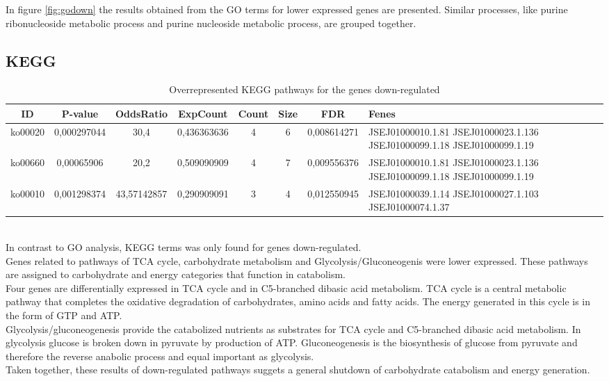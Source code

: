 \documentclass[12pt, a4paper]{report}
\begin{document}
In figure \ref{fig:godown} the results obtained from the GO terms for lower expressed genes are presented. Similar processes, like purine ribonucleoside metabolic process and purine nucleoside metabolic process, are grouped together. 


\subsection{KEGG}

\begin{table}[H]
	\centering
	\tiny
	\begin{tabular}{c|c|c|c|c|c|c|p{2cm}}
		\textbf{ID}&\textbf{P-value}&\textbf{OddsRatio}&\textbf{ExpCount}&\textbf{Count}&\textbf{Size}& \textbf{FDR}&\textbf{Fenes}\\
		\hline
ko00020&	0,000297044&	30,4&	0,436363636	&4	&6&	0,008614271	&JSEJ01000010.1.81 JSEJ01000023.1.136 JSEJ01000099.1.18 JSEJ01000099.1.19\\
\hline
ko00660&	0,00065906&	20,2&	0,509090909&	4&	7&	0,009556376	&JSEJ01000010.1.81 JSEJ01000023.1.136 JSEJ01000099.1.18 JSEJ01000099.1.19\\
\hline
ko00010&	0,001298374&	43,57142857&	0,290909091&	3&	4&	0,012550945&JSEJ01000039.1.14 JSEJ01000027.1.103 JSEJ01000074.1.37\\
		\hline
	\end{tabular}
	\caption{Overrepresented KEGG pathways for the genes down-regulated}
\end{table}
\ \\
In contrast to GO analysis, KEGG terms was only found for genes down-regulated. \\
Genes related to pathways of TCA cycle, carbohydrate metabolism and Glycolysis/Gluconeogenis were lower expressed. These pathways are assigned to carbohydrate and energy categories that function in catabolism.\\
Four genes are differentially expressed in TCA cycle and in C5-branched dibasic acid metabolism. TCA cycle is a central metabolic pathway that completes the oxidative degradation of carbohydrates, amino acids and fatty acids. The energy generated in this cycle is in the form of GTP and ATP. \\
Glycolysis/gluconeogenesis provide the catabolized nutrients as substrates for TCA cycle and C5-branched dibasic acid metabolism. In glycolysis glucose is broken down in pyruvate by production of ATP. Gluconeogenesis is the biosynthesis of glucose from pyruvate and therefore the reverse anabolic process and equal important as glycolysis. \\
Taken together, these results of down-regulated pathways suggets a general shutdown of carbohydrate catabolism and energy generation.
\end{document}

